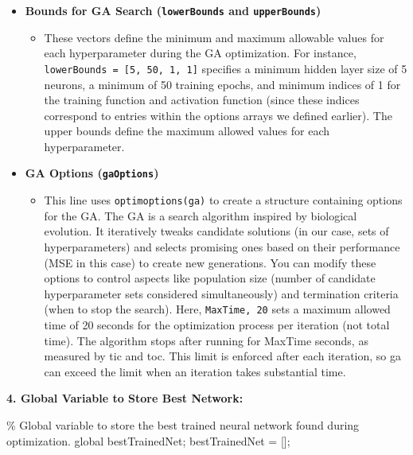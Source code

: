 \documentclass[
  super,
  review,
  3p]{elsarticle}
\newenvironment{Shaded}{\begin{snugshade}}{\end{snugshade}}
\newcommand{\CommentTok}[1]{\textcolor[rgb]{0.37,0.37,0.37}{#1}}
\newcommand{\KeywordTok}[1]{\textcolor[rgb]{0.00,0.23,0.31}{#1}}
\newcommand{\NormalTok}[1]{\textcolor[rgb]{0.00,0.23,0.31}{#1}}
\newcommand{\OperatorTok}[1]{\textcolor[rgb]{0.37,0.37,0.37}{#1}}
\newcommand{\VariableTok}[1]{\textcolor[rgb]{0.07,0.07,0.07}{#1}}
\providecommand{\tightlist}{%
  \setlength{\itemsep}{0pt}\setlength{\parskip}{0pt}}\usepackage{longtable,booktabs,array}
\begin{document}
\begin{itemize}
\tightlist
\item
  \textbf{Bounds for GA Search (\texttt{lowerBounds} and
  \texttt{upperBounds})}

  \begin{itemize}
  \tightlist
  \item
    These vectors define the minimum and maximum allowable values for
    each hyperparameter during the GA optimization. For instance,
    \texttt{lowerBounds\ =\ {[}5,\ 50,\ 1,\ 1{]}} specifies a minimum
    hidden layer size of 5 neurons, a minimum of 50 training epochs, and
    minimum indices of 1 for the training function and activation
    function (since these indices correspond to entries within the
    options arrays we defined earlier). The upper bounds define the
    maximum allowed values for each hyperparameter.
  \end{itemize}
\item
  \textbf{GA Options (\texttt{gaOptions})}

  \begin{itemize}
  \tightlist
  \item
    This line uses
    \texttt{optimoptions(\textquotesingle{}ga\textquotesingle{})} to
    create a structure containing options for the GA. The GA is a search
    algorithm inspired by biological evolution. It iteratively tweaks
    candidate solutions (in our case, sets of hyperparameters) and
    selects promising ones based on their performance (MSE in this case)
    to create new generations. You can modify these options to control
    aspects like population size (number of candidate hyperparameter
    sets considered simultaneously) and termination criteria (when to
    stop the search). Here,
    \texttt{\textquotesingle{}MaxTime\textquotesingle{},\ 20} sets a
    maximum allowed time of 20 seconds for the optimization process per
    iteration (not total time). The algorithm stops after running for
    MaxTime seconds, as measured by tic and toc. This limit is enforced
    after each iteration, so ga can exceed the limit when an iteration
    takes substantial time.
  \end{itemize}
\end{itemize}

\textbf{4. Global Variable to Store Best Network:}

\begin{Shaded}
\begin{Highlighting}[]
    \CommentTok{\% Global variable to store the best trained neural network found during optimization.}
    \KeywordTok{global} \VariableTok{bestTrainedNet}\OperatorTok{;}
    \VariableTok{bestTrainedNet} \OperatorTok{=}\NormalTok{ []}\OperatorTok{;}
\end{Highlighting}
\end{Shaded}
\end{document}
